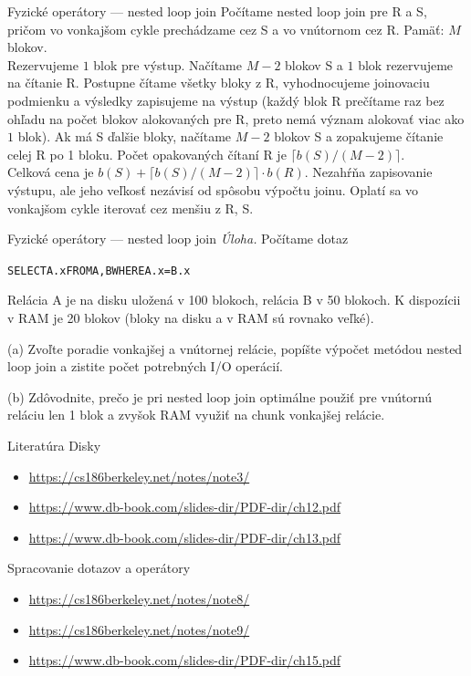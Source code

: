 \documentclass[12pt]{beamer}
\begin{document}
\begin{frame}{Fyzické operátory --- nested loop join}
\hbox{}
{\small
Počítame \alert{nested loop join} pre R a S,
pričom vo vonkajšom cykle prechádzame cez S a vo vnútornom cez R.
Pamäť: $M$ blokov.\\[2mm]
Rezervujeme $1$ blok pre výstup.
Načítame $M-2$ blokov S a $1$ blok rezervujeme na čítanie R.
Postupne čítame všetky bloky z R, vyhodnocujeme joinovaciu podmienku a výsledky zapisujeme na výstup
(každý blok R prečítame raz bez ohľadu na počet blokov alokovaných pre R, preto nemá význam alokovať viac ako $1$ blok).
Ak má S ďalšie bloky, načítame $M-2$ blokov S a zopakujeme čítanie celej R po 1 bloku.
Počet opakovaných čítaní R je $\lceil b(S) / (M-2)\rceil$.\\[2mm]
Celková cena je $b(S) + \lceil b(S) / (M-2)\rceil\cdot b(R)$.
Nezahŕňa zapisovanie výstupu, ale jeho veľkosť nezávisí od spôsobu výpočtu joinu.
Oplatí sa vo vonkajšom cykle iterovať cez menšiu z R, S.
}
\end{frame}

\begin{frame}[fragile]{Fyzické operátory --- nested loop join}
\emph{Úloha.}
Počítame dotaz
\begin{alltt}
  SELECT A.x FROM A, B WHERE A.x = B.x
\end{alltt}
Relácia A je na disku uložená v 100 blokoch, relácia B v 50 blokoch.
K dispozícii v RAM je 20 blokov (bloky na disku a v RAM sú rovnako veľké).

(a) Zvoľte poradie vonkajšej a vnútornej relácie, popíšte výpočet metódou \alert{nested loop join}
a zistite počet potrebných I/O operácií.

(b) Zdôvodnite, prečo je pri nested loop join optimálne použiť pre vnútornú reláciu len 1 blok
a zvyšok RAM využiť na chunk vonkajšej relácie.
\end{frame}


\begin{frame}{Literatúra}
Disky
\begin{itemize}
\item {\scriptsize\url{https://cs186berkeley.net/notes/note3/}}
\item {\scriptsize\url{https://www.db-book.com/slides-dir/PDF-dir/ch12.pdf}}
\item {\scriptsize\url{https://www.db-book.com/slides-dir/PDF-dir/ch13.pdf}}
\end{itemize}
\bigskip

Spracovanie dotazov a operátory
\begin{itemize}
\item {\scriptsize\url{https://cs186berkeley.net/notes/note8/}}
\item {\scriptsize\url{https://cs186berkeley.net/notes/note9/}}
\item {\scriptsize\url{https://www.db-book.com/slides-dir/PDF-dir/ch15.pdf}}
\end{itemize}
\end{frame}
\end{document}
